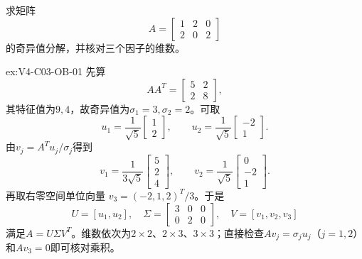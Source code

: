 \begin{SLChapterExercisePairSection}

\begin{exercise}\label{ex:V4-C03-OB-01}
求矩阵
\[
A=\begin{bmatrix}1&2&0\\2&0&2\end{bmatrix}
\]
的奇异值分解，并核对三个因子的维数。
\end{exercise}
\ifSLFullEdition
{}\label{sol:V4-C03-OB-01}
\begin{chapterexercisesolution}{ex:V4-C03-OB-01}
先算
\[
AA^T=\begin{bmatrix}5&2\\2&8\end{bmatrix},
\]
其特征值为$9,4$，故奇异值为$\sigma_1=3,\sigma_2=2$。可取
\[
u_1=\frac1{\sqrt5}\begin{bmatrix}1\\2\end{bmatrix},
\qquad
u_2=\frac1{\sqrt5}\begin{bmatrix}-2\\1\end{bmatrix}.
\]
由$v_j=A^Tu_j/\sigma_j$得到
\[
v_1=\frac1{3\sqrt5}\begin{bmatrix}5\\2\\4\end{bmatrix},
\qquad
v_2=\frac1{\sqrt5}\begin{bmatrix}0\\-2\\1\end{bmatrix}.
\]
再取右零空间单位向量
$v_3=(-2,1,2)^T/3$。于是
\[
U=[u_1,u_2],\quad
\Sigma=\begin{bmatrix}3&0&0\\0&2&0\end{bmatrix},\quad
V=[v_1,v_2,v_3]
\]
满足$A=U\Sigma V^T$。维数依次为$2\times2$、$2\times3$、$3\times3$；直接检查$Av_j=\sigma_ju_j$（$j=1,2$）和$Av_3=0$即可核对乘积。
\end{chapterexercisesolution}
\fi


\end{SLChapterExercisePairSection}
